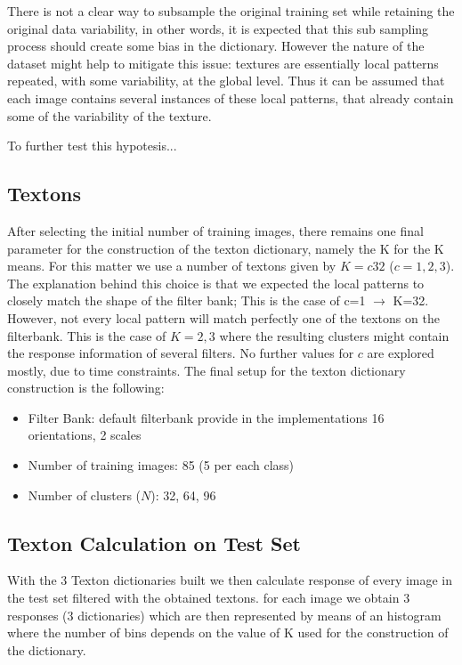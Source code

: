 \documentclass[a4paper]{article}
\begin{document}
There is not a clear way to subsample the original training set while retaining the original data variability, in other words, it is expected that this sub sampling process should create some bias in the dictionary. However the nature of the dataset might help to mitigate this issue: textures are essentially local patterns repeated, with some variability, at the global level. Thus it can be assumed that each image contains several instances of these local patterns, that already contain some of the variability of the texture.

To further test this hypotesis...  


\subsection{Textons}
After selecting the initial number of training images, there remains one final parameter for the construction of the texton dictionary, namely the K for the K means. For this matter we use a number of textons given by $K=c32$ ($c={1,2,3}$). The explanation behind this choice is that we expected the local patterns to closely match the shape of the filter bank; This is the case of c=1 $\rightarrow$ K=32. However, not every local pattern will match perfectly one of the textons on the filterbank. This is the case of $K={2,3}$ where the resulting clusters might contain the response information of several filters. No further values for $c$ are explored mostly, due to time constraints.
The final setup for the texton dictionary construction is the following:

\begin{itemize}
	\item Filter Bank: default filterbank provide in the implementations 16 orientations, 2 scales
	\item Number of training images: 85 (5 per each class)
	\item Number of clusters ($N$):  32, 64, 96
\end{itemize}

\subsection{Texton Calculation on Test Set}

With the 3 Texton dictionaries built we then calculate response of every image in the test set filtered with the obtained textons. for each image we obtain 3 responses (3 dictionaries) which are then represented by means of an histogram where the number of bins depends on the value of K used for the construction of the dictionary.
\end{document}
